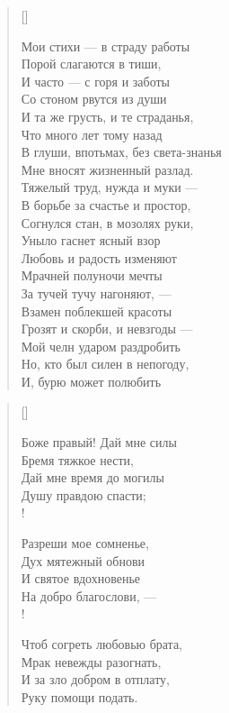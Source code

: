 \newpage
\vspace*{0cm}


\settowidth{\versewidth}{И та же грусть, и те страданья,}
\begin{verse}[\versewidth]
\begin{altverse}
Мои стихи --- в страду работы\\
    Порой слагаются в тиши,\\
И часто --- с горя и заботы\\
    Со стоном рвутся из души\ldotst\\
И та же грусть, и те страданья,\\
    Что много лет тому назад\\
В глуши, впотьмах, без света-знанья\\
	Мне вносят жизненный разлад.\\
Тяжелый труд, нужда и муки ---\\
    В борьбе за счастье и простор,\\
Согнулся стан, в мозолях руки,\\
    Уныло гаснет ясный взор\ldotst\\
Любовь и радость изменяют\ldotst\\
    Мрачней полуночи мечты\ldotst\\
За тучей тучу нагоняют, ---\\
    Взамен поблекшей красоты\ldotst\\
Грозят и скорби, и невзгоды ---\\
    Мой челн ударом раздробить\ldotse\\
Но, кто был силен в непогоду,\\
    И, бурю может полюбить\ldotst
\end{altverse}
\end{verse}

\newpage
\vspace*{0cm}



\settowidth{\versewidth}{Боже правый! Дай мне силы}
\begin{verse}[\versewidth]
\begin{altverse}
Боже правый! Дай мне силы\\
    Бремя тяжкое нести,\\
Дай мне время до могилы\\
    Душу правдою спасти;\\!

Разреши мое сомненье,\\
    Дух мятежный обнови\\
И святое вдохновенье\\
    На добро благослови, ---\\!

Чтоб согреть любовью брата,\\
    Мрак невежды разогнать,\\
И за зло добром в отплату,\\
    Руку помощи подать.
\end{altverse}
\end{verse}


